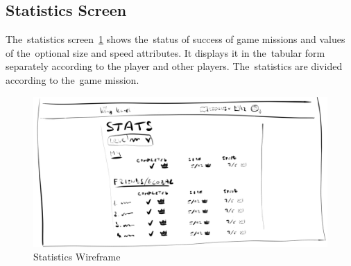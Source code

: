 \subsection{Statistics Screen}

The~statistics screen~\ref{fig:design:wir:statistics} shows the~status of success of game missions and values of the~optional size and speed attributes.
It displays it in the~tabular form separately according to the player and other players.
The~statistics are divided according to the~game mission.

\begin{figure}
    \centering
    \includegraphics[width=1\linewidth]{assets/design/ui/wir_stats.png}
    \caption{Statistics Wireframe}
    \label{fig:design:wir:statistics}
\end{figure}
